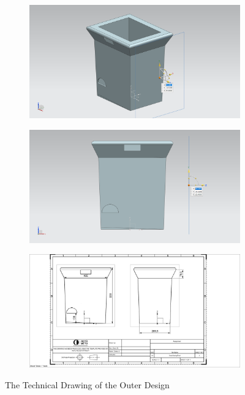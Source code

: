 \begin{figure}[h!] %
     \centering
     \begin{subfigure}[b]{0.49\linewidth}
     \includegraphics[width=\linewidth]{content/060_mechanical_design/3box.png}
     \end{subfigure}
     \begin{subfigure}[b]{0.49\linewidth}
     \includegraphics[width=\linewidth]{content/060_mechanical_design/4box.png}
     \end{subfigure}
     \label{fig:pwm}
     \begin{subfigure}[c]{0.49\linewidth}
     \includegraphics[width=\linewidth]{content/060_mechanical_design/5Technical.png}
     \end{subfigure}
     \caption{The Technical Drawing of the Outer Design}
     \label{fig:OuterBox}
\end{figure}

